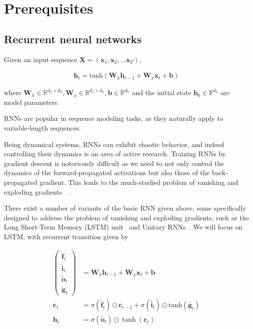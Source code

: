 \documentclass{article} %
\newcommand{\vect}[1]{\mathbf{#1}}
\newcommand{\mat}[1]{\mathbf{#1}}
\newcommand{\ewprod}{\odot}
\newcommand{\reals}{\mathbb{R}}
\begin{document}
\section{Prerequisites}
\label{sec:prerequisites}

\subsection{Recurrent neural networks}

Given an input sequence $\mat{X} = ( \vect{x}_1, \vect{x}_2, ... \vect{x}_T )$,

\begin{align}
\vect{h}_t = \mathrm{tanh}(
  \mat{W}_h \vect{h}_{t-1} +
  \mat{W}_x \vect{x}_t +
  \vect{b})
\end{align}

where $\mat{W}_h \in \reals^{d_h \times d_h},
       \mat{W}_x \in \reals^{d_x \times d_h},
       \vect{b} \in \reals^{d_h}$
  and the initial state $\vect{h}_0 \in \reals^{d_h}$
  are model parameters.

RNNs are popular in sequence modeling tasks, as they naturally apply to variable-length sequences.

Being dynamical systems, RNNs can exhibit chaotic behavior, and indeed controlling their dynamics is an area of active research.
Training RNNs by gradient descent is notoriously difficult as we need to not only control the dynamics of the forward-propagated activations but also those of the back-propagated gradient.
This leads to the much-studied problem of vanishing and exploding gradients~\cite{bengiolongterm}~\cite{pascanudifficulty}.

There exist a number of variants of the basic RNN given above, some specifically designed to address the problem of vanishing and exploding gradients, such as the Long Short-Term Memory (LSTM) unit~\cite{lstm} and Unitary RNNs~\cite{urnn}.  We will focus on LSTM, with recurrent transition given by

\begin{align}
\left(\begin{array}{ccc}
\tilde{\vect{f}}_t \\
\tilde{\vect{i}}_t \\
\tilde{\vect{o}}_t \\
\tilde{\vect{g}}_t
\end{array}\right)
 &=
 \mat{W}_h \vect{h}_{t-1} +
 \mat{W}_x \vect{x}_t +
 \vect{b}
\\
\vect{c}_t &= \sigma(\tilde{\vect{f}}_t) \ewprod \vect{c}_{t-1} +
              \sigma(\tilde{\vect{i}}_t) \ewprod \mathrm{tanh}(\tilde{\vect{g}_t}) \\
\vect{h}_t &= \sigma(\tilde{\vect{o}}_t) \ewprod \tanh(\vect{c}_t)
\end{align}
\end{document}
